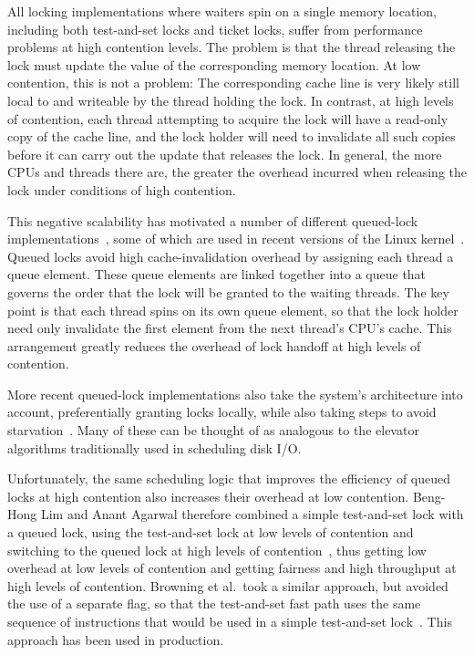 \fi

All locking implementations where waiters spin on a single memory
location, including both test-and-set locks and ticket locks,
suffer from performance problems at high contention levels.
The problem is that the thread releasing the lock must update the
value of the corresponding memory location.
At low contention, this is not a problem: The corresponding cache line
is very likely still local to and writeable by the thread holding
the lock.
In contrast, at high levels of contention, each thread attempting to
acquire the lock will have a read-only copy of the cache line, and
the lock holder will need to invalidate all such copies before it
can carry out the update that releases the lock.
In general, the more CPUs and threads there are, the greater the
overhead incurred when releasing the lock under conditions of
high contention.

This negative scalability has motivated a number of different
queued-lock
implementations~\cite{Anderson90,Graunke90,MellorCrummey91a,Wisniewski94,Craig93,Magnusson94,Takada93},
some of which are used in recent versions of the Linux
kernel~\cite{JonathanCorbet2014qspinlocks}.
Queued locks avoid high cache-invalidation overhead by assigning each
thread a queue element.
These queue elements are linked together into a queue that governs the
order that the lock will be granted to the waiting threads.
The key point is that each thread spins on its own queue element,
so that the lock holder need only invalidate the first element from
the next thread's CPU's cache.
This arrangement greatly reduces the overhead of lock handoff at high
levels of contention.

More recent queued-lock implementations also take the system's architecture
into account, preferentially granting locks locally, while also taking
steps to avoid
starvation~\cite{McKenney02e,radovic03hierarchical,radovic02efficient,BenJackson02,McKenney02d}.
Many of these can be thought of as analogous to the elevator algorithms
traditionally used in scheduling disk I/O.

Unfortunately, the same scheduling logic that improves the efficiency
of queued locks at high contention also increases their overhead at
low contention.
Beng-Hong Lim and Anant Agarwal therefore combined a simple test-and-set
lock with a queued lock, using the test-and-set lock at low levels of
contention and switching to the queued lock at high levels of
contention~\cite{BengHongLim94}, thus getting low overhead at low levels
of contention and getting fairness and high throughput at high levels
of contention.
Browning et al.\ took a similar approach, but avoided the use of a separate
flag, so that the test-and-set fast path uses the same sequence of
instructions that would be used in a simple test-and-set
lock~\cite{LukeBrowning2005SimpleLockNUMAAware}.
This approach has been used in production.

